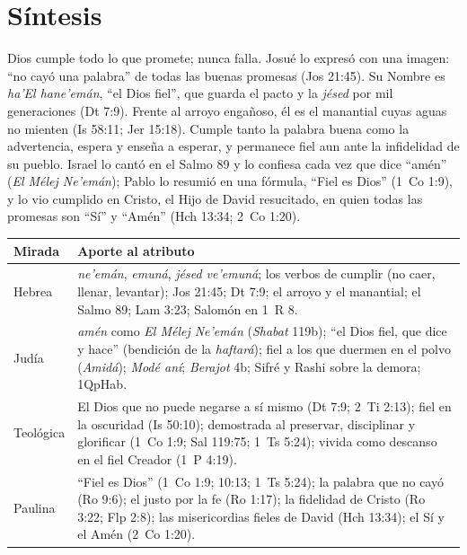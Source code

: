 \section{Síntesis}

\begin{tcolorbox}[colback=papiro,colframe=azul,boxrule=1pt,arc=3pt]
Dios cumple todo lo que promete; nunca falla. Josué lo expresó con una imagen: ``no cayó una palabra'' de todas las buenas promesas (Jos 21:45). Su Nombre es \emph{ha'El hane'emán}, ``el Dios fiel'', que guarda el pacto y la \emph{jésed} por mil generaciones (Dt 7:9). Frente al arroyo engañoso, él es el manantial cuyas aguas no mienten (Is 58:11; Jer 15:18). Cumple tanto la palabra buena como la advertencia, espera y enseña a esperar, y permanece fiel aun ante la infidelidad de su pueblo. Israel lo cantó en el Salmo 89 y lo confiesa cada vez que dice ``amén'' (\emph{El Mélej Ne'emán}); Pablo lo resumió en una fórmula, ``Fiel es Dios'' (1~Co 1:9), y lo vio cumplido en Cristo, el Hijo de David resucitado, en quien todas las promesas son ``Sí'' y ``Amén'' (Hch 13:34; 2~Co 1:20).
\end{tcolorbox}

\begin{center}\small\renewcommand{\arraystretch}{1.3}
\begin{tabular}{@{}L{3.0cm}L{11.4cm}@{}}
\toprule
\textbf{Mirada} & \textbf{Aporte al atributo} \\ \midrule
Hebrea & \emph{ne'emán}, \emph{emuná}, \emph{jésed ve'emuná}; los verbos de cumplir (no caer, llenar, levantar); Jos 21:45; Dt 7:9; el arroyo y el manantial; el Salmo 89; Lam 3:23; Salomón en 1~R 8. \\
Judía & \emph{amén} como \emph{El Mélej Ne'emán} (\emph{Shabat} 119b); ``el Dios fiel, que dice y hace'' (bendición de la \emph{haftará}); fiel a los que duermen en el polvo (\emph{Amidá}); \emph{Modé aní}; \emph{Berajot} 4b; Sifré y Rashi sobre la demora; 1QpHab. \\
Teológica & El Dios que no puede negarse a sí mismo (Dt 7:9; 2~Ti 2:13); fiel en la oscuridad (Is 50:10); demostrada al preservar, disciplinar y glorificar (1~Co 1:9; Sal 119:75; 1~Ts 5:24); vivida como descanso en el fiel Creador (1~P 4:19). \\
Paulina & ``Fiel es Dios'' (1~Co 1:9; 10:13; 1~Ts 5:24); la palabra que no cayó (Ro 9:6); el justo por la fe (Ro 1:17); la fidelidad de Cristo (Ro 3:22; Flp 2:8); las misericordias fieles de David (Hch 13:34); el Sí y el Amén (2~Co 1:20). \\
\bottomrule
\end{tabular}\end{center}

